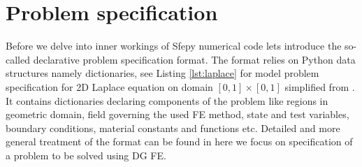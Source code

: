 \section{Problem specification}
Before we delve into inner workings of Sfepy numerical code lets introduce the so-called 
declarative problem specification format. The format relies on Python data structures 
namely dictionaries, see 
Listing \ref{lst:laplace} for model problem specification for 2D Laplace equation on 
domain $[0, 1] \times [0, 1]$ simplified from . It 
contains dictionaries declaring components of the problem like regions in geometric 
domain, field governing the used FE method, state and test variables, boundary 
conditions, material constants and functions etc. Detailed and more general treatment of 
the format can be found in \cite{Cimrman_Lukes_Rohan_2019} here we focus on specification 
of a problem to be solved using DG FE.

